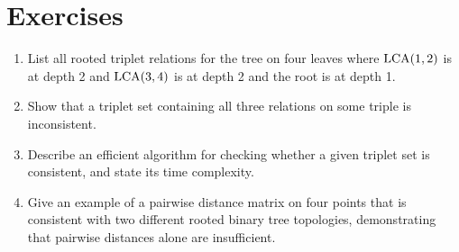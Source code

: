 \section{Exercises}

\begin{enumerate}
  \item List all rooted triplet relations for the tree on four leaves where $\operatorname{LCA}(1,2)$ is at depth 2 and $\operatorname{LCA}(3,4)$ is at depth 2 and the root is at depth 1.
  \item Show that a triplet set containing all three relations on some triple is inconsistent.
  \item Describe an efficient algorithm for checking whether a given triplet set is consistent, and state its time complexity.
  \item Give an example of a pairwise distance matrix on four points that is consistent with two different rooted binary tree topologies, demonstrating that pairwise distances alone are insufficient.
\end{enumerate}
